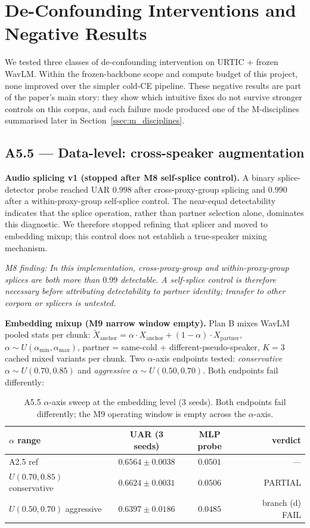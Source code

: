 \section{De-Confounding Interventions and Negative Results}
\label{sec:deconf}

We tested three classes of de-confounding intervention on URTIC + frozen WavLM. Within the frozen-backbone scope and compute budget of this project, none improved over the simpler cold-CE pipeline. These negative results are part of the paper's main story: they show which intuitive fixes do not survive stronger controls on this corpus, and each failure mode produced one of the M-disciplines summarised later in Section~\ref{ssec:m_disciplines}.

\subsection{A5.5 --- Data-level: cross-speaker augmentation}
\label{ssec:a5_5}

\textbf{Audio splicing v1 (stopped after M8 self-splice control).} A binary splice-detector probe reached UAR $0.998$ after cross-proxy-group splicing and $0.990$ after a within-proxy-group self-splice control. The near-equal detectability indicates that the splice operation, rather than partner selection alone, dominates this diagnostic. We therefore stopped refining that splicer and moved to embedding mixup; this control does not establish a true-speaker mixing mechanism.

\textit{M8 finding:} \emph{In this implementation, cross-proxy-group and within-proxy-group splices are both more than $0.99$ detectable. A self-splice control is therefore necessary before attributing detectability to partner identity; transfer to other corpora or splicers is untested.}

\textbf{Embedding mixup (M9 narrow window empty).} Plan B mixes WavLM pooled stats per chunk: $\tilde{X}_{\text{anchor}} = \alpha \cdot X_{\text{anchor}} + (1-\alpha) \cdot X_{\text{partner}}$, $\alpha \sim U(\alpha_{\min}, \alpha_{\max})$, partner = same-cold + different-pseudo-speaker, $K{=}3$ cached mixed variants per chunk. Two $\alpha$-axis endpoints tested: \emph{conservative} $\alpha \sim U(0.70, 0.85)$ and \emph{aggressive} $\alpha \sim U(0.50, 0.70)$. Both endpoints fail differently:

\begin{table}[t]
\centering\small
\caption{A5.5 $\alpha$-axis sweep at the embedding level (3 seeds). Both endpoints fail differently; the M9 operating window is empty across the $\alpha$-axis.}
\label{tab:a55_alpha}
\begin{tabular}{lccr}
\toprule
$\alpha$ range & UAR (3 seeds) & MLP probe & verdict \\
\midrule
A2.5 ref       & $0.6564 \pm 0.0038$ & $0.0501$ & --- \\
$U(0.70, 0.85)$ conservative & $0.6624 \pm 0.0031$ & $0.0506$ & PARTIAL \\
$U(0.50, 0.70)$ aggressive   & $0.6397 \pm 0.0186$ & $0.0485$ & branch (d) FAIL \\
\bottomrule
\end{tabular}
\end{table}

